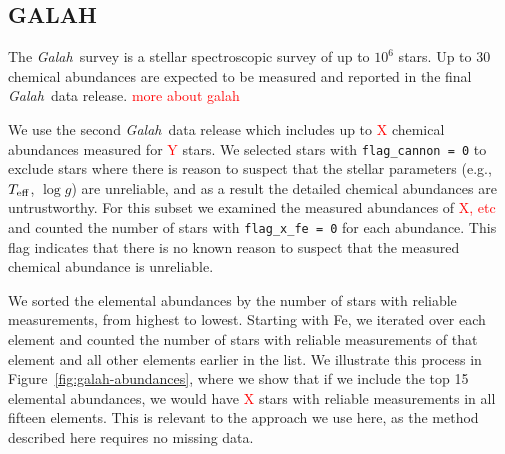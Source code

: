 \documentclass[twocolumn]{aastex61}
\newcommand\teff{T_{\rm eff}}
\newcommand\logg{\log{g}}
\newcommand{\project}[1]{\textsl{#1}}
\newcommand{\Galah}{\project{Galah}}
\newcommand{\todo}[1]{\textcolor{red}{#1}}
\begin{document}



\subsection{GALAH} \label{sec:experiment-galah}

The \Galah\ survey is a stellar spectroscopic survey of up to
$10^6$ stars. Up to 30 chemical abundances are expected to be measured
and reported in the final \Galah\ data release.
\todo{more about galah}

We use the second \Galah\ data release \citep{Buder:2018a} which
includes up to \todo{X} chemical abundances measured for \todo{Y}
stars. We selected stars with \texttt{flag\_cannon = 0} to exclude
stars where there is reason to suspect that the stellar parameters
(e.g., $\teff$, $\logg$) are unreliable, and as a result the 
detailed chemical abundances are untrustworthy. For this subset
we examined the measured abundances of \todo{X, etc} and
counted the number of stars with \texttt{flag\_x\_fe = 0}
for each abundance. This flag indicates that there is no known
reason to suspect that the measured chemical abundance is
unreliable. 

We sorted the elemental abundances by the number of stars
with reliable measurements, from highest to lowest. Starting
with Fe, we iterated over each element and counted the number
of stars with reliable measurements of that element and all
other elements earlier in the list. We illustrate this process
in Figure~\ref{fig:galah-abundances}, where we show that
if we include the top 15 elemental abundances, we would have
\todo{X} stars with reliable measurements in all fifteen elements.
This is relevant to the approach we use here, as the method
described here requires no missing data.
\end{document}
